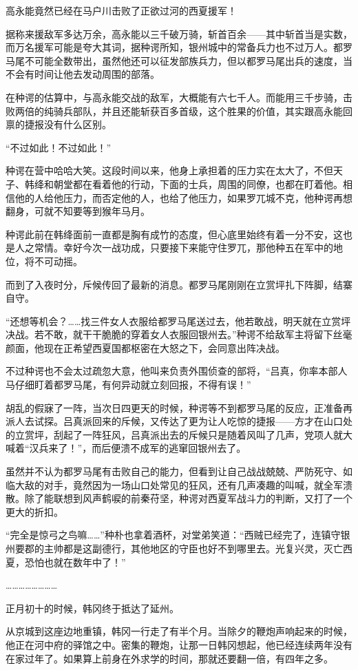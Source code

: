 高永能竟然已经在马户川击败了正欲过河的西夏援军！

据称来援敌军多达万余，高永能以三千破万骑，斩首百余——其中斩首当是实数，而万名援军可能是夸大其词，据种谔所知，银州城中的常备兵力也不过万人。都罗马尾不可能全数带出，虽然他还可以征发部族兵力，但以都罗马尾出兵的速度，当不会有时间让他去发动周围的部落。

在种谔的估算中，与高永能交战的敌军，大概能有六七千人。而能用三千步骑，击败两倍的纯骑兵部队，并且还能斩获百多首级，这个胜果的价值，其实跟高永能回禀的捷报没有什么区别。

“不过如此！不过如此！”

种谔在营中哈哈大笑。这段时间以来，他身上承担着的压力实在太大了，不但天子、韩绛和朝堂都在看着他的行动，下面的士兵，周围的同僚，也都在盯着他。相信他的人给他压力，而否定他的人，也给了他压力，如果罗兀城不克，他种谔再想翻身，可就不知要等到猴年马月。

种谔此前在韩绛面前一直都是胸有成竹的态度，但心底里始终有着一分不安，这也是人之常情。幸好今次一战功成，只要接下来能守住罗兀，那他种五在军中的地位，将不可动摇。

而到了入夜时分，斥候传回了最新的消息。都罗马尾刚刚在立赏坪扎下阵脚，结寨自守。

“还想等机会？……找三件女人衣服给都罗马尾送过去，他若敢战，明天就在立赏坪决战。若不敢，就干干脆脆的穿着女人衣服回银州去。”种谔不给敌军主将留下丝毫颜面，他现在正希望西夏国都枢密在大怒之下，会同意出阵决战。

不过种谔也不会太过疏忽大意，他叫来负责外围侦查的部将，“吕真，你率本部人马仔细盯着都罗马尾，有何异动就立刻回报，不得有误！”

胡乱的假寐了一阵，当次日四更天的时候，种谔等不到都罗马尾的反应，正准备再派人去试探。吕真派回来的斥候，又传达了更为让人吃惊的捷报——方才在山口处的立赏坪，刮起了一阵狂风，吕真派出去的斥候只是随着风叫了几声，党项人就大喊着“汉兵来了！”，而后便溃不成军的逃窜回银州去了。

虽然并不认为都罗马尾有击败自己的能力，但看到让自己战战兢兢、严防死守、如临大敌的对手，竟然因为一场山口处常见的狂风，还有几声凑趣的叫喊，就全军溃散。除了能联想到风声鹤唳的前秦苻坚，种谔对西夏军战斗力的判断，又打了一个更大的折扣。

“完全是惊弓之鸟嘛……”种朴也拿着酒杯，对堂弟笑道：“西贼已经完了，连镇守银州要郡的主帅都是这副德行，其他地区的守臣也好不到哪里去。光复兴灵，灭亡西夏，恐怕也就在数年中了！”

……………………

正月初十的时候，韩冈终于抵达了延州。

从京城到这座边地重镇，韩冈一行走了有半个月。当除夕的鞭炮声响起来的时候，他正在河中府的驿馆之中。密集的鞭炮，让那一日韩冈想起，他已经连续两年没有在家过年了。如果算上前身在外求学的时间，那就还要翻一倍，有四年之多。

